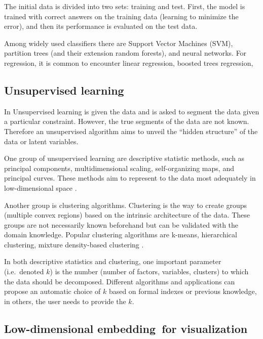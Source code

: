 \documentclass[12pt,]{book}
\theoremstyle{definition}
\theoremstyle{definition}
\theoremstyle{definition}
\theoremstyle{remark}
\begin{document}
The initial data is divided into two sets: training and test. First, the
model is trained with correct answers on the training data (learning to
minimize the error), and then its performance is evaluated on the test
data.

Among widely used classifiers there are Support Vector Machines (SVM),
partition trees (and their extension random forests), and neural
networks. For regression, it is common to encounter linear regression,
boosted trees regression,

\hypertarget{unsup}{%
\subsection{Unsupervised learning}\label{unsup}}

In Unsupervised learning is given the data and is asked to segment the
data given a particular constraint. However, the true segments of the
data are not known. Therefore an unsupervised algorithm aims to unveil
the ``hidden structure'' of the data or latent variables.

One group of unsupervised learning are descriptive statistic methods,
such as principal components, multidimensional scaling, self-organizing
maps, and principal curves. These methods aim to represent to the data
most adequately in low-dimensional space \citep{Hastie2009}.

Another group is clustering algorithms. Clustering is the way to create
groups (multiple convex regions) based on the intrinsic architecture of
the data. These groups are not necessarily known beforehand but can be
validated with the domain knowledge. Popular clustering algorithms are
k-means, hierarchical clustering, mixture density-based clustering
\citep{Xu2008}.

In both descriptive statistics and clustering, one important parameter
(i.e.~denoted \(k\)) is the number (number of factors, variables,
clusters) to which the data should be decomposed. Different algorithms
and applications can propose an automatic choice of \(k\) based on
formal indexes or previous knowledge, in others, the user needs to
provide the \(k\).

\hypertarget{low-dimensional-embeddingfor-visualization}{%
\subsection{Low-dimensional embedding~for
visualization}\label{low-dimensional-embeddingfor-visualization}}
\end{document}
